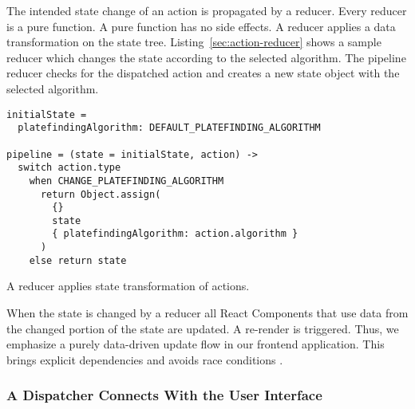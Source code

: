 \documentclass[../../ClassicThesis.tex]{subfiles}
\begin{document}
The intended state change of an action is propagated by a
reducer. Every reducer is a pure function. A pure function
has no side effects. A reducer applies a data transformation
on the state tree. Listing~\ref{sec:action-reducer} shows a
sample reducer which changes the state according to the
selected algorithm. The pipeline reducer checks for
the dispatched action and creates a new state object with the
selected algorithm.

\begin{listing}[h]
\begin{verbatim}
initialState =
  platefindingAlgorithm: DEFAULT_PLATEFINDING_ALGORITHM

pipeline = (state = initialState, action) ->
  switch action.type
    when CHANGE_PLATEFINDING_ALGORITHM
      return Object.assign(
        {}
        state
        { platefindingAlgorithm: action.algorithm }
      )
    else return state
\end{verbatim}
\caption{A reducer applies state transformation of actions.}
\label{lst:action-reducer}
\end{listing}

When the state is changed by a reducer all React Components
that use data from the changed portion of the state are
updated. A re-render is triggered. Thus, we emphasize a
purely data-driven update flow in our frontend application.
This brings explicit dependencies and avoids race conditions
\cite{redux}.

\subsubsection{A Dispatcher Connects {\convertify} With the User
  Interface}
\label{dispatch-and-dispatcher}


\end{document}
